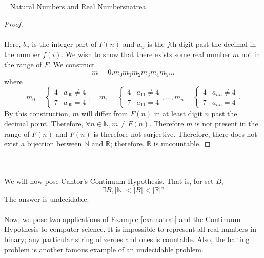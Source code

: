 \begin{example}{\Difficulty\,\Difficulty\,\Difficulty\,\Difficulty\,\,Natural Numbers and Real Numbers}{natrea}
\begin{proof}
                \\
                \\
                Here, \(b_n\) is the integer part of \(F(n)\) and \(a_{ij}\) is the \(j\)th digit past the decimal in the number \(f(i)\). We wish to show that there exists some real number \(m\) not in the range of \(F\). We construct 
                \begin{equation*}
                    m=0.m_0m_1m_2m_3m_4m_5\ldots
                \end{equation*}
                where
                \begin{equation*}
                    m_0=\begin{cases} 4 & a_{00}\neq 4 \\ 7 & a_{00}=4 \end{cases}, \quad m_1=\begin{cases} 4 & a_{11}\neq 4 \\ 7 & a_{11}=4 \end{cases},\ldots, m_n=\begin{cases} 4 & a_{nn}\neq 4 \\ 7 & a_{nn}=4 \end{cases}.
                \end{equation*}
                By this construction, \(m\) will differ from \(F(n)\) in at least digit \(n\) past the decimal point. Therefore, \(\forall n\in\mathbb{N}, m\neq F(n)\). Therefore \(m\) is not present in the range of \(F(n)\) and \(F(n)\) is therefore not surjective. Therefore, there does not exist a bijection between \(\mathbb{N}\) and \(\mathbb{R}\); therefore, \(\mathbb{R}\) is uncountable.
            \end{proof}
        
        \end{example}
        \vphantom
        \\
        \\
        We will now pose Cantor's Continuum Hypothesis. That is, for set \(B\),
        \begin{equation*}
            \exists B, |\mathbb{N}|<|B|<|\mathbb{R}|?
        \end{equation*}
        The answer is undecidable.
        \\
        \\
        Now, we pose two applications of Example \ref{exa:natrat} and the Continuum Hypothesis to computer science. It is impossible to represent all real numbers in binary; any particular string of zeroes and ones is countable. Also, the halting problem is another famous example of an undecidable problem.
        
